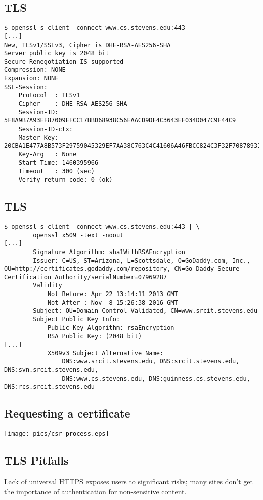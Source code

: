 \documentclass[xga]{xdvislides}
\begin{document}
\subsection{TLS}
\begin{verbatim}
$ openssl s_client -connect www.cs.stevens.edu:443
[...]
New, TLSv1/SSLv3, Cipher is DHE-RSA-AES256-SHA
Server public key is 2048 bit
Secure Renegotiation IS supported
Compression: NONE
Expansion: NONE
SSL-Session:
    Protocol  : TLSv1
    Cipher    : DHE-RSA-AES256-SHA
    Session-ID: 5F8A9B7A93EF87009EFCC17BBD68938C56EAACD9DF4C3643EF034D047C9F44C9
    Session-ID-ctx: 
    Master-Key: 20CBA1E477A8B573F29759045329EF7AA38C763C4C41606A46FBCC824C3F32F708789311E7B4275470E35CF09518FDCD
    Key-Arg   : None
    Start Time: 1460395966
    Timeout   : 300 (sec)
    Verify return code: 0 (ok)
\end{verbatim}

\subsection{TLS}
\begin{verbatim}
$ openssl s_client -connect www.cs.stevens.edu:443 | \
        openssl x509 -text -noout
[...]
        Signature Algorithm: sha1WithRSAEncryption
        Issuer: C=US, ST=Arizona, L=Scottsdale, O=GoDaddy.com, Inc., OU=http://certificates.godaddy.com/repository, CN=Go Daddy Secure Certification Authority/serialNumber=07969287
        Validity
            Not Before: Apr 22 13:14:11 2013 GMT
            Not After : Nov  8 15:26:38 2016 GMT
        Subject: OU=Domain Control Validated, CN=www.srcit.stevens.edu
        Subject Public Key Info:
            Public Key Algorithm: rsaEncryption
            RSA Public Key: (2048 bit)
[...]
            X509v3 Subject Alternative Name: 
                DNS:www.srcit.stevens.edu, DNS:srcit.stevens.edu, DNS:svn.srcit.stevens.edu,
                DNS:www.cs.stevens.edu, DNS:guinness.cs.stevens.edu, DNS:rcs.srcit.stevens.edu
\end{verbatim}

\subsection{Requesting a certificate}
\begin{center}
	\texttt{[image: pics/csr-process.eps]}
\end{center}

\subsection{TLS Pitfalls}
Lack of universal HTTPS exposes users to significant
risks; many sites don't get the importance of
authentication for non-sensitive content. \\
\end{document}
